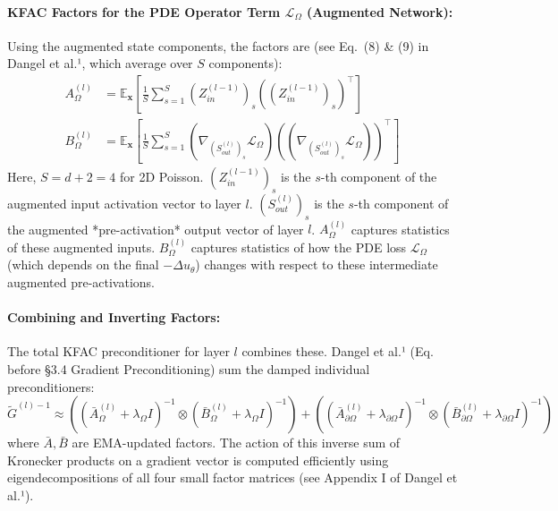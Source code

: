 \documentclass[12pt,a4paper]{article}
\newcommand{\E}{\mathbb{E}}
\newcommand{\kron}{\otimes}
\newcommand{\vect}[1]{\mathbf{#1}} %
\begin{document}
\paragraph{KFAC Factors for the PDE Operator Term \(\mathcal{L}_{\Omega}\) (Augmented Network):}
Using the augmented state components, the factors are (see Eq.~(8) \& (9) in Dangel et al.¹, which average over \(S\) components):
\begin{align*}
A_\Omega^{(l)} &= \E_{\vect{x}} \left[ \frac{1}{S} \sum_{s=1}^{S} (Z_{in}^{(l-1)})_{s} ((Z_{in}^{(l-1)})_{s})^{\top} \right] \\
B_\Omega^{(l)} &= \E_{\vect{x}} \left[ \frac{1}{S} \sum_{s=1}^{S} (\nabla_{(S_{out}^{(l)})_{s}} \mathcal{L}_\Omega) ((\nabla_{(S_{out}^{(l)})_{s}} \mathcal{L}_\Omega))^{\top} \right]
\end{align*}
Here, \(S=d+2=4\) for 2D Poisson. \((Z_{in}^{(l-1)})_{s}\) is the \(s\)-th component of the augmented input activation vector to layer \(l\). \((S_{out}^{(l)})_{s}\) is the \(s\)-th component of the augmented *pre-activation* output vector of layer \(l\). \(A_\Omega^{(l)}\) captures statistics of these augmented inputs. \(B_\Omega^{(l)}\) captures statistics of how the PDE loss \(\mathcal{L}_\Omega\) (which depends on the final \(-\Delta u_\theta\)) changes with respect to these intermediate augmented pre-activations.

\paragraph{Combining and Inverting Factors:}
The total KFAC preconditioner for layer \(l\) combines these. Dangel et al.¹ (Eq. before §3.4 Gradient Preconditioning) sum the damped individual preconditioners:
\[ \tilde{G}^{(l)-1} \approx ((\bar{A}_{\Omega}^{(l)}+\lambda_\Omega I)^{-1} \kron (\bar{B}_{\Omega}^{(l)}+\lambda_\Omega I)^{-1}) + ((\bar{A}_{\partial\Omega}^{(l)}+\lambda_{\partial\Omega} I)^{-1} \kron (\bar{B}_{\partial\Omega}^{(l)}+\lambda_{\partial\Omega} I)^{-1}) \]
where \(\bar{A}, \bar{B}\) are EMA-updated factors. The action of this inverse sum of Kronecker products on a gradient vector is computed efficiently using eigendecompositions of all four small factor matrices (see Appendix I of Dangel et al.¹).
\end{document}

